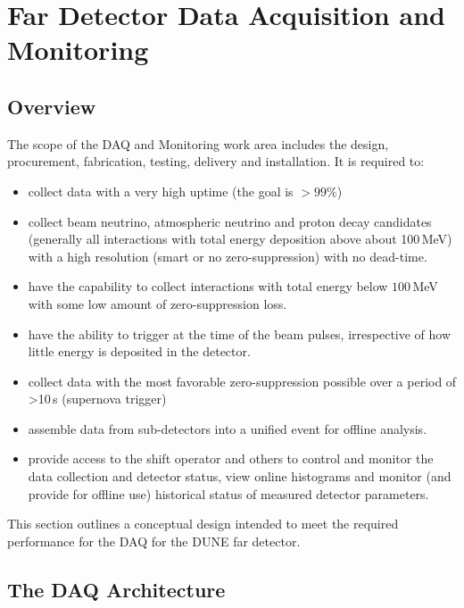 \section{Far Detector Data Acquisition and Monitoring}
\label{sec:daq}

\subsection{Overview}

The scope of the DAQ and Monitoring work area includes the design, procurement, fabrication, testing, delivery and installation.
It is required to:
\begin{itemize}
\item collect data with a very high uptime (the goal is $>99\%$)

\item collect beam neutrino, atmospheric neutrino and proton  decay candidates (generally all interactions
with total energy deposition above about 100\,MeV) with a high resolution (smart or no zero-suppression) with no dead-time.

\item have the capability to collect interactions with total energy  below $100$\,MeV with some
 low amount of zero-suppression loss.

\item have the ability to trigger at the time of the beam pulses,  irrespective of how little energy is deposited in the detector.

\item collect data with the most favorable zero-suppression possible over a  period of >10\,s (supernova trigger)

\item assemble data from sub-detectors into a unified  event for offline analysis.
\item provide access to the shift operator and others to control and   monitor the data collection and detector status, view online
  histograms and monitor (and provide for offline use) historical  status of measured detector parameters. 

\end{itemize}

This section outlines a conceptual design intended to meet the required performance for the DAQ
for the DUNE far detector. 


\subsection{The DAQ Architecture}

